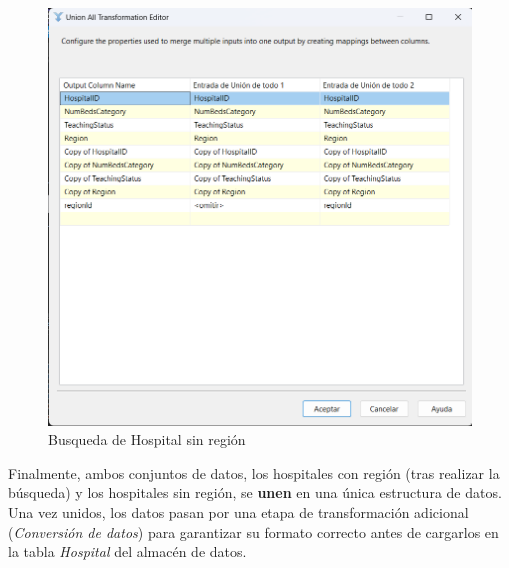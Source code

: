 \documentclass{article}
\begin{document}
	\begin{figure}[H]
		\centering
		\includegraphics[width=.7\linewidth]{./images/tutorial/union_hospital_con_o_sin_region.png}
		\caption{Busqueda de Hospital sin región}
	\end{figure}
	Finalmente, ambos conjuntos de datos, los hospitales con región (tras realizar la búsqueda) y los hospitales sin región, se \textbf{unen} en una única estructura de datos. Una vez unidos, los datos pasan por una etapa de transformación adicional (\textit{Conversión de datos}) para garantizar su formato correcto antes de cargarlos en la tabla \textit{Hospital} del almacén de datos.
\end{document}
